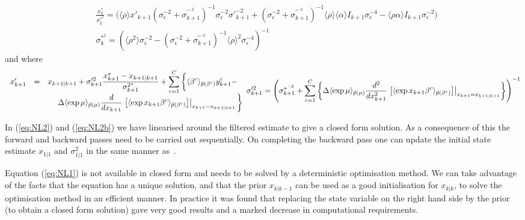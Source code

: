\documentclass{article}
\begin{document}
\[ \begin{split} &\frac{x_{k}^*}{\sigma^{*^2}_{k}} = \bigg(\langle \rho \rangle
	x'_{k+1}(\sigma^{-2}_\epsilon + \sigma^{'^{-2}}_{k+1})^{-1}
	\sigma^{-2}_\epsilon\sigma'^{-2}_{k+1} + (\sigma^{-2}_\epsilon + \sigma^{'^{-2}}_{k+1})^{-1}
	\langle \rho \rangle \langle \alpha \rangle I_{k+1}\sigma^{-4}_\epsilon - \langle \rho\alpha
	\rangle I_{k+1}\sigma^{-2}_\epsilon \bigg)\\ &\sigma^{*^2}_{k} = (\langle \rho^2
	\rangle\sigma^{-2}_\epsilon - (\sigma^{-2}_\epsilon + \sigma^{'^{-2}}_{k+1})^{-1}\langle
	\rho \rangle^2\sigma^{-4}_\epsilon )^{-1} \end{split} \] \noindent and where
	\begin{subequations} \begin{equation} \begin{array}{rcl} x'_{k+1} &=& \displaystyle
		x_{k+1|k+1} + \sigma'^2_{k+1}\frac{x_{k+1}^* - x_{k+1|k+1}}{\sigma^{2^*}_{k+1}} +
		\sum_{c=1}^C \bigg\{\langle\beta^c\rangle_{\pt(\beta^c)}y^c_{k+1} - \\[2ex] &&
		~~~~\displaystyle \Delta \langle \exp{\mu} \rangle_{\pt(\mu)}
		\frac{d}{dx_{k+1}}\left.\left[\langle \exp{x_{k+1}\beta^c}
		\rangle_{\pt(\beta^c)}\right]\right|_{x_{k+1} = x_{k+1|k+1} }  \bigg\}
		\label{eq:NL2}  \\ \end{array} \end{equation} \begin{equation} \sigma'^2_{k+1} =
			\left({\sigma}^{*^{-2}}_{k+1} + \sum_{c=1}^C \left\{\Delta  \langle
			\exp{\mu} \rangle_{\pt(\mu)} \frac{d^2}{dx_{k+1}^2}\left.\left[\langle
			\exp{x_{k+1}\beta^c} \rangle_{\pt(\beta^c)}\right]\right|_{x_{k+1} =
			x_{k+1|k+1}}\right\}\right)^{-1} \label{eq:NL2b} \end{equation}
		\end{subequations}
		
		In (\ref{eq:NL2}) and (\ref{eq:NL2b}) we have linearised around
		the filtered estimate to give a closed form solution. As a consequence of this the forward and backward passes need to be carried out	sequentially. On completing the backward pass one can update the initial state estimate $x_{1|1}$ and $\sigma^2_{1|1}$ in the same manner	as~\cite{Smith_2003}.

Equation (\ref{eq:NL1}) is not available in closed form and needs to be solved by a deterministic
optimisation method. We can take advantage of the facts that the equation has a unique solution, and
that the prior $x_{k|k-1}$ can be used as a good initialisation for $x_{k|k}$, to solve the optimisation method
in an efficient manner. In practice it was found that replacing the state variable on the right hand
side by the prior (to obtain a closed form solution) gave very good results and a marked decrease in
computational requirements.
\end{document}

